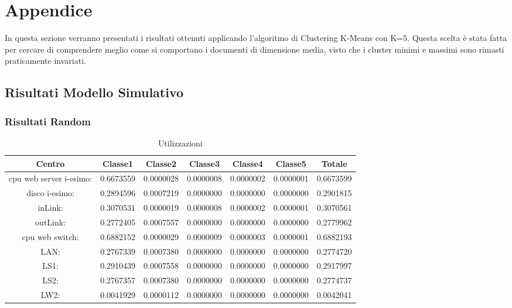 \chapter{Appendice}\label{appendice}
In questa sezione verranno presentati i risultati ottenuti applicando l'algoritmo di Clustering K-Means con K=5. Questa scelta è stata fatta per cercare di comprendere meglio come si comportano i documenti di dimensione media, visto che i cluster minimi e massimi sono rimasti praticamente invariati. 
\section{Risultati Modello Simulativo}
\subsection{Risultati Random}
\begin{table}[H]
\begin{center}\begin{scriptsize}
\begin{tabular}{||c|c|c|c|c|c|c||}
\hline
Centro &Classe1 &Classe2 &Classe3 &Classe4 &Classe5 &Totale\\
\hline
\hline
 cpu web server i-esimo: 	&0.6673559	&0.0000028	&0.0000008	&0.0000002	&0.0000001	&0.6673599\\
\hline
 disco i-esimo: 	&0.2894596	&0.0007219	&0.0000000	&0.0000000	&0.0000000	&0.2901815\\
\hline
 inLink: 	&0.3070531	&0.0000019	&0.0000008	&0.0000002	&0.0000001	&0.3070561\\
\hline
 outLink: 	&0.2772405	&0.0007557	&0.0000000	&0.0000000	&0.0000000	&0.2779962\\
\hline
 cpu web switch: 	&0.6882152	&0.0000029	&0.0000009	&0.0000003	&0.0000001	&0.6882193\\
\hline
 LAN: 	&0.2767339	&0.0007380	&0.0000000	&0.0000000	&0.0000000	&0.2774720\\
\hline
 LS1: 	&0.2910439	&0.0007558	&0.0000000	&0.0000000	&0.0000000	&0.2917997\\
\hline
 LS2:	&0.2767357	&0.0007380	&0.0000000	&0.0000000	&0.0000000	&0.2774737\\
\hline
 LW2: 	&0.0041929	&0.0000112	&0.0000000	&0.0000000	&0.0000000	&0.0042041\\
\hline
\end{tabular}
\end{scriptsize}\end{center}
\caption{Utilizzazioni}
\label{risrandom}
\end{table}

